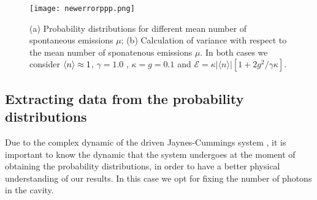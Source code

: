 \documentclass[conference]{IEEEtran}
\begin{document}
\begin{center}
\begin{figure*}[!t]\label{error2}
\begin{center}
\texttt{[image: newerrorppp.png]}
\caption{\small{(a) Probability distributions for different mean number of spontaneous emissions $\mu$; (b) Calculation of variance with respect to the mean number of sponatenous emissions $\mu$. In both cases we consider $\expval{n} \approx 1$, $\gamma = 1.0$ , $\kappa = g = 0.1$ and $\mathcal{E} =  \kappa |\langle n \rangle|[1 + 2g^2/\gamma \kappa]$.}} \label{probdisult}
\end{center}
\end{figure*}
\end{center}
\subsection{Extracting data from the probability distributions}
Due to the complex dynamic of the driven Jaynes-Cummings system \cite{Carmichael1993Open}, it is important to know the dynamic that the system undergoes at the moment of obtaining the probability distributions, in order to have a better physical understanding of our results. In this case we opt for fixing the number of photons in the cavity.
\end{document}
